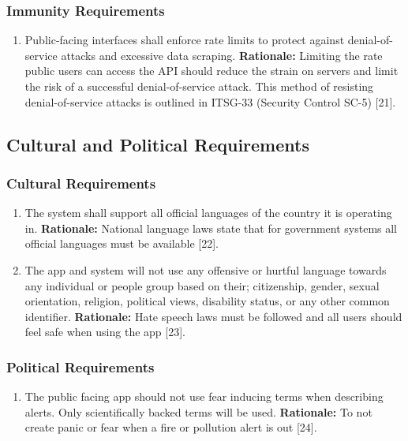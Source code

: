 \documentclass[]{article}
\begin{document}
\subsubsection{Immunity Requirements}
\label{ssub:immunity_requirements}
\begin{enumerate}[{SR-IM}1. ]
	\item Public-facing interfaces shall enforce rate limits to protect against denial-of-service attacks and excessive data scraping.\newline
	{\bf Rationale:} Limiting the rate public users can access the API should reduce the strain on servers and limit the risk of a successful denial-of-service attack. This method of resisting denial-of-service attacks is outlined in ITSG-33 (Security Control SC-5) [21].
\end{enumerate}


\subsection{Cultural and Political Requirements}
\label{sub:cultural_and_political_requirements}

\subsubsection{Cultural Requirements}
\label{ssub:cultural_requirements}
\begin{enumerate}[{CP-C}1. ]
	\item The system shall support all official languages of the country it is operating in.\newline
	{\bf Rationale:} National language laws state that for government systems all official languages must be available [22].
	\item The app and system will not use any offensive or hurtful language towards any individual or people group based on their; citizenship, gender, sexual orientation, religion, political views, disability status, or any other common identifier.\newline
	{\bf Rationale:} Hate speech laws must be followed and all users should feel safe when using the app [23].
\end{enumerate}

\subsubsection{Political Requirements}
\label{ssub:political_requirements}
\begin{enumerate}[{CP-P}1. ]
	\item The public facing app should not use fear inducing terms when describing alerts. Only scientifically backed terms will be used.\newline
	{\bf Rationale:} To not create panic or fear when a fire or pollution alert is out [24].
\end{enumerate}
\end{document}
